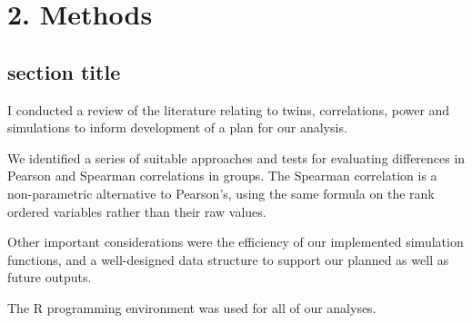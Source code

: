 \chapter*{2. Methods}
\setcounter{chapter}{2}
\setcounter{section}{0}


\section{section title}


I conducted a review of the literature relating to twins, correlations, power and simulations to inform development of a plan for our analysis.  

We identified a series of suitable approaches and tests for evaluating differences in Pearson and Spearman correlations in groups.  The Spearman correlation is a non-parametric alternative to Pearson's, using the same formula on the rank ordered variables rather than their raw values.

Other important considerations were the efficiency of our implemented simulation functions, and a well-designed data structure to support our planned as well as future outputs.  

The R programming environment was used for all of our analyses.

